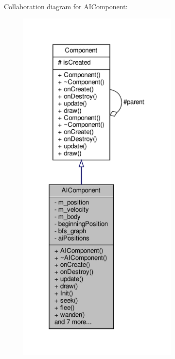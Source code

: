 Collaboration diagram for A\+I\+Component\+:
\nopagebreak
\begin{figure}[H]
\begin{center}
\leavevmode
\includegraphics[width=228pt]{classAIComponent__coll__graph}
\end{center}
\end{figure}
